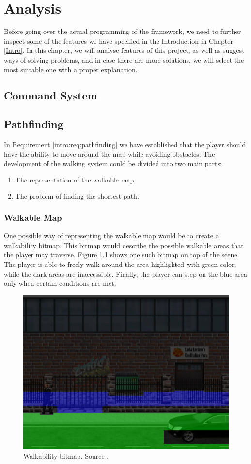 \chapter{Analysis}

Before going over the actual programming of the framework, we need to further inspect some of the features we have specified in the Introduction in Chapter \ref{Intro}. In this chapter, we will analyse features of this project, as well as suggest ways of solving problems, and in case there are more solutions, we will select the most suitable one with a proper explanation.


\section{Command System}


\section{Pathfinding}
In Requirement \ref{intro:req:pathfinding}  we have established that the player should have the ability to move around the map while avoiding obstacles. 
The development of the walking system could be divided into two main parts:
\begin{enumerate}
    \item The representation of the walkable map,
    \item The problem of finding the shortest path.
\end{enumerate} 

\subsection{Walkable Map}
One possible way of representing the walkable map would be to create a walkability bitmap. This bitmap would describe the possible walkable areas that the player may traverse. Figure \ref{fig:Bitmap} shows one such bitmap on top of the scene. The player is able to freely walk around the area highlighted with green color, while the dark areas are inaccessible. Finally, the player can step on the blue area only when certain conditions are met. 

\begin{figure}[H]
\centering
\includegraphics[width=.8\linewidth]{img/walkability.png}
\caption{Walkability bitmap. Source \cite{Shdon}.}
\label{fig:Bitmap}
\end{figure}

